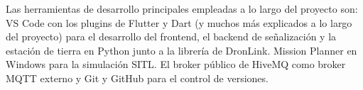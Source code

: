 Las herramientas de desarrollo principales empleadas a lo largo del proyecto son: VS Code con los plugins de Flutter y Dart (y muchos más explicados a lo largo del proyecto) para el desarrollo del frontend, el backend de señalización y la estación de tierra en Python junto a la librería de DronLink. Mission Planner en Windows para la simulación SITL. El broker público de HiveMQ como broker MQTT externo y Git y GitHub para el control de versiones. 
